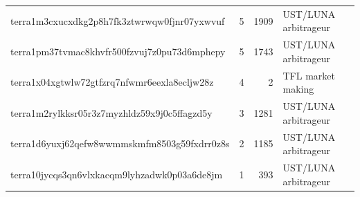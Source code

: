 \begin{center}
{\begin{tabular}{llrl}
            terra1m3cxucxdkg2p8h7fk3ztwrwqw0fjnr07yxwvuf & 5           & 1909              & UST/LUNA arbitrageur     \\
            terra1pm37tvmac8khvfr500fzvuj7z0pu73d6mphepy & 5           & 1743              & UST/LUNA arbitrageur     \\
            terra1x04xgtwlw72gtfzrq7nfwmr6eexla8ecljw28z & 4           & 2                 & TFL market making        \\
            terra1m2rylkksr05r3z7myzhldz59x9j0c5ffagzd5y & 3           & 1281              & UST/LUNA arbitrageur     \\
            terra1d6yuxj62qefw8wwmmskmfm8503g59fxdrr0z8s & 2           & 1185              & UST/LUNA arbitrageur     \\
            terra10jycqs3qn6vlxkacqm9lyhzadwk0p03a6de8jm & 1           & 393               & UST/LUNA arbitrageur     \\
            \bottomrule
        \end{tabular}
    }
\end{center}
